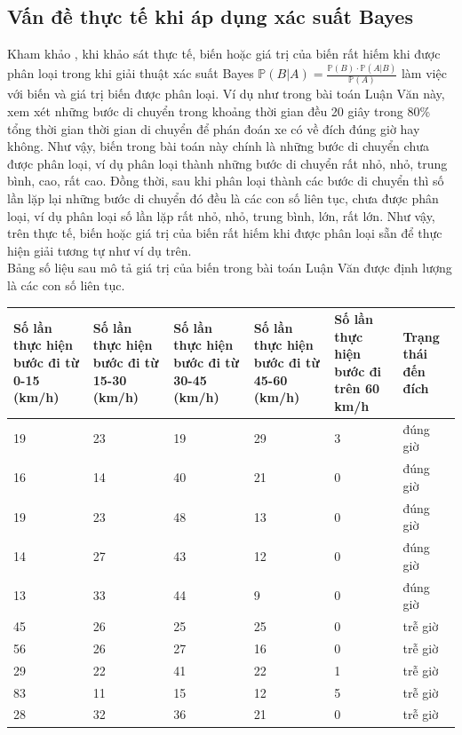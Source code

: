 \documentclass[a4paper, 13pt]{report}
\begin{document}
\subsection*{Vấn đề thực tế khi áp dụng xác suất Bayes}
Kham khảo \cite{2WAYSOFNB}, khi khảo sát thực tế, biến hoặc giá trị của biến rất hiếm khi được phân loại trong khi giải thuật xác suất Bayes $\mathbb{P}(B|A) = \frac{\mathbb{P}(B) \cdot \mathbb{P}(A|B)}{\mathbb{P}(A)}$ làm việc với biến và giá trị biến được phân loại. Ví dụ như trong bài toán Luận Văn này, xem xét những bước di chuyển trong khoảng thời gian đều 20 giây trong 80\% tổng thời gian thời gian di chuyển để phán đoán xe có về đích đúng giờ hay không. Như vậy, biến trong bài toán này chính là những bước di chuyển chưa được phân loại, ví dụ phân loại thành những bước di chuyển rất nhỏ, nhỏ, trung bình, cao, rất cao. Đồng thời, sau khi phân loại thành các bước di chuyển thì số lần lặp lại những bước di chuyển đó đều là các con số liên tục, chưa được phân loại, ví dụ phân loại số lần lặp rất nhỏ, nhỏ, trung bình, lớn, rất lớn. Như vậy, trên thực tế, biến hoặc giá trị của biến rất hiếm khi được phân loại sẵn để thực hiện giải tương tự như ví dụ trên.\\
Bảng số liệu sau mô tả giá trị của biến trong bài toán Luận Văn được định lượng là các con số liên tục.
\begin{flushleft}
\begin{tabular}{|p{2.6cm}|p{2.6cm}|p{2.6cm}|p{2.6cm}|p{2.6cm}|p{1.5cm}|}
\hline
Số lần thực hiện bước đi từ 0-15 (km/h)& Số lần thực hiện bước đi từ 15-30 (km/h) & Số lần thực hiện bước đi từ 30-45 (km/h) & Số lần thực hiện bước đi từ 45-60 (km/h) & Số lần thực hiện bước đi trên 60 km/h & Trạng thái đến đích \\ 
\hline
19 & 23 & 19 & 29 & 3 & đúng giờ\\
\hline
16 & 14 & 40 & 21 & 0 & đúng giờ\\
\hline
19 & 23 & 48 & 13 & 0 & đúng giờ\\
\hline
14 & 27 & 43 & 12 & 0 & đúng giờ\\
\hline
13 & 33 & 44 & 9 & 0 & đúng giờ \\
\hline
45 & 26 & 25 & 25 & 0 & trễ giờ\\
\hline
56 & 26 & 27 & 16 & 0 & trễ giờ\\
\hline
29 & 22 & 41 & 22 & 1 & trễ giờ\\
\hline
83 & 11 & 15 & 12 & 5 & trễ giờ\\
\hline
28 & 32 & 36 & 21 & 0 & trễ giờ\\
\hline
\end{tabular}
\end{flushleft}
\end{document}
